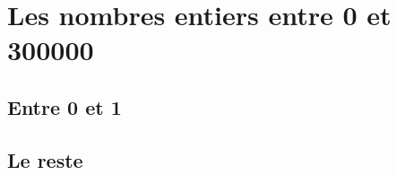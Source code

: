 \chapter{Les nombres entiers entre 0 et 300000}
\minitoc

\section{Entre 0 et 1}
\blindtext[10]

\section{Le reste}
\blindtext[10]
